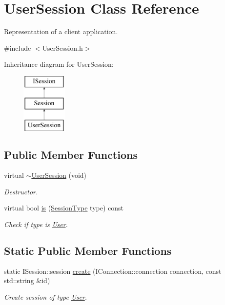 \hypertarget{class_user_session}{\section{User\-Session Class Reference}
\label{class_user_session}
}


Representation of a client application.  




{\ttfamily \#include $<$User\-Session.\-h$>$}

Inheritance diagram for User\-Session\-:\begin{figure}[H]
\begin{center}
\leavevmode
\includegraphics[height=3.000000cm]{class_user_session}
\end{center}
\end{figure}
\subsection*{Public Member Functions}
\begin{DoxyCompactItemize}
\item 
\hypertarget{class_user_session_ac8ed03f6784f2e84e642d1c77aa63298}{virtual \hyperlink{class_user_session_ac8ed03f6784f2e84e642d1c77aa63298}{$\sim$\-User\-Session} (void)}\label{class_user_session_ac8ed03f6784f2e84e642d1c77aa63298}

\begin{DoxyCompactList}\small\item\em Destructor. \end{DoxyCompactList}\item 
virtual bool \hyperlink{class_user_session_a93c2510fa0fd6bb2411b7b6640c12606}{is} (\hyperlink{class_i_session_a7989a93d03d8345d213a021d7444a32f}{Session\-Type} type) const 
\begin{DoxyCompactList}\small\item\em Check if type is \hyperlink{struct_user}{User}. \end{DoxyCompactList}\end{DoxyCompactItemize}
\subsection*{Static Public Member Functions}
\begin{DoxyCompactItemize}
\item 
static I\-Session\-::session \hyperlink{class_user_session_a542ad4b16a842ba7b88a8f60760423a9}{create} (I\-Connection\-::connection connection, const std\-::string \&id)
\begin{DoxyCompactList}\small\item\em Create session of type \hyperlink{struct_user}{User}. \end{DoxyCompactList}\end{DoxyCompactItemize}
